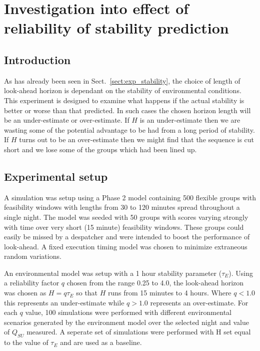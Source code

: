 \section{Investigation into effect of reliability of stability prediction}
\label{sect:exp_reliability}

\subsection{Introduction} 
As has already been seen in Sect.~\ref{sect:exp_stability}, the choice of length of look-ahead horizon is dependant on the stability of environmental conditions. This experiment is designed to examine what happens if the actual stability is better or worse than that predicted. In such cases the chosen horizon length will be an under-estimate or over-estimate. If $H$ is an under-estimate then we are wasting some of the potential advantage to be had from a long period of stability. If $H$ turns out to be an over-estimate then we might find that the sequence is cut short and we lose some of the groups which had been lined up.

\subsection{Experimental setup}
A simulation was setup using a Phase 2 model containing 500 flexible groups with feasibility windows with lengths from 30 to 120 minutes spread throughout a single night. The model was seeded with 50 groups with scores varying strongly with time over very short (15 minute) feasibility windows. These groups could easily be missed by a despatcher and were intended to boost the performance of look-ahead. A fixed execution timing model was chosen to minimize extraneous random variations.

An environmental model was setup with a 1 hour stability parameter ($\tau_E$). Using a reliability factor $q$ chosen from the range 0.25 to 4.0, the look-ahead horizon was chosen as $H=q\tau_E$ so that $H$ runs from 15 minutes to 4 hours. Where $q<1.0$ this represents an under-estimate while $q>1.0$ represents an over-estimate.  For each $q$ value, 100 simulations were performed with different environmental scenarios generated by the environment model over the selected night and value of $Q_{SU}$ measured. A seperate set of simulations were performed with H set equal to the value of $\tau_E$ and are used as a baseline.

